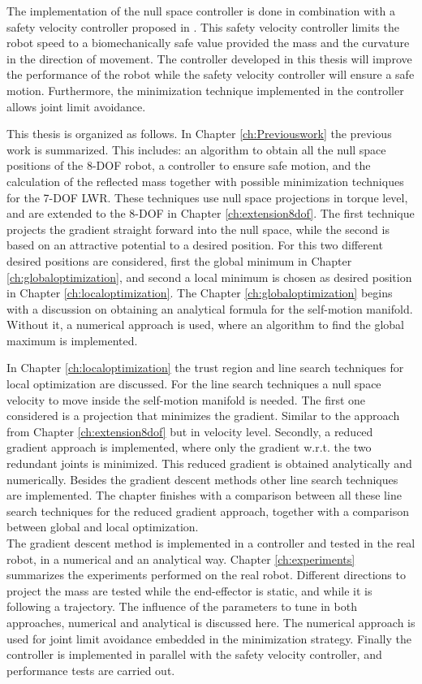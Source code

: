 The implementation of the null space controller is done in combination with a safety velocity controller proposed in \cite{sammi_paper}. This safety velocity controller limits the robot speed to a biomechanically safe value provided the mass and the curvature in the direction of movement. The controller developed in this thesis will improve the performance of the robot while the safety velocity controller will ensure a safe motion. Furthermore, the minimization technique implemented in the controller allows joint limit avoidance.

This thesis is organized as follows. In Chapter \ref{ch:Previouswork} the previous work is summarized. This includes: an algorithm to obtain all the null space positions of the 8-DOF robot, a controller to ensure safe motion, and the calculation of the reflected mass together with possible minimization techniques for the 7-DOF LWR. These techniques use null space projections in torque level, and are extended to the 8-DOF in Chapter \ref{ch:extension8dof}. The first technique projects the gradient straight forward into the null space, while the second is based on an attractive potential to a desired position.  For this two different desired positions are considered, first the global minimum in Chapter \ref{ch:globaloptimization}, and second a local minimum is chosen as desired position in Chapter \ref{ch:localoptimization}. The Chapter \ref{ch:globaloptimization} begins with a discussion on obtaining an analytical formula for the self-motion manifold. Without it, a numerical approach is used, where an algorithm to find the global maximum is implemented. 

In Chapter \ref{ch:localoptimization} the trust region and line search techniques for local optimization are discussed. For the line search techniques a null space velocity to move inside the self-motion manifold is needed. The first one considered is a projection that minimizes the gradient. Similar to the approach from Chapter \ref{ch:extension8dof} but in velocity level. Secondly, a reduced gradient approach is implemented, where only the gradient w.r.t. the two redundant joints is minimized. This reduced gradient is obtained analytically and numerically. Besides the gradient descent methods other line search techniques are implemented. The chapter finishes with a comparison between all these line search techniques for the reduced gradient approach, together with a comparison between global and local optimization.\\
The gradient descent method is implemented in a controller and tested in the real robot, in a numerical and an analytical way. Chapter \ref{ch:experiments} summarizes the experiments performed on the real robot. Different directions to project the mass are tested while the end-effector is static, and while it is following a trajectory. The influence of the parameters to tune in both approaches, numerical and analytical is discussed here. The numerical approach is used for joint limit avoidance embedded in the minimization strategy. Finally the controller is implemented in parallel with the safety velocity controller, and performance tests are carried out.




